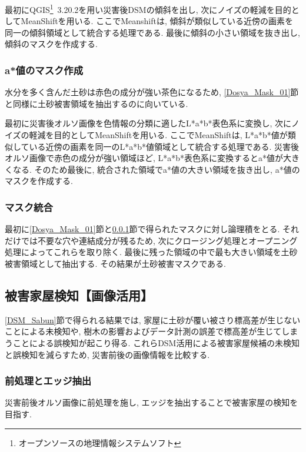 \documentclass[a4paper, twocolumn, xelatex, 10pt, ja=standard, Ligatures=TeX]{bxjsarticle}
\begin{document}
				最初にQGIS\footnote{オープンソースの地理情報システムソフト}\ 3.20.2を用い災害後DSMの傾斜を出し, 次にノイズの軽減を目的としてMeanShiftを用いる. 
				ここでMeanshiftは, 傾斜が類似している近傍の画素を同一の傾斜領域として統合する処理である. 最後に傾斜の小さい領域を抜き出し, 傾斜のマスクを作成する. 

			\subsubsection{a*値のマスク作成}\label{Dosya_Mask_02}
				水分を多く含んだ土砂は赤色の成分が強い茶色になるため, \ref{Dosya_Mask_01}節と同様に土砂被害領域を抽出するのに向いている. 

				最初に災害後オルソ画像を色情報の分類に適したL*a*b*表色系に変換し, 次にノイズの軽減を目的としてMeanShiftを用いる. 
				ここでMeanShiftは, L*a*b*値が類似している近傍の画素を同一のL*a*b*値領域として統合する処理である. 
				災害後オルソ画像で赤色の成分が強い領域ほど, L*a*b*表色系に変換するとa*値が大きくなる. 
				そのため最後に, 統合された領域でa*値の大きい領域を抜き出し, a*値のマスクを作成する. 

			\subsubsection{マスク統合}\label{Dosya_Mask_03}
				最初に\ref{Dosya_Mask_01}節と\ref{Dosya_Mask_02}節で得られたマスクに対し論理積をとる. 
				それだけでは不要な穴や連結成分が残るため, 次にクロージング処理とオープニング処理によってこれらを取り除く. 
				最後に残った領域の中で最も大きい領域を土砂被害領域として抽出する. その結果が土砂被害マスクである. 

		\subsection{被害家屋検知【画像活用】}\label{Ortho_Sabun}
			\ref{DSM_Sabun}節で得られる結果では, 家屋に土砂が覆い被さり標高差が生じないことによる未検知や, 
			樹木の影響およびデータ計測の誤差で標高差が生じてしまうことによる誤検知が起こり得る. 
			これらDSM活用による被害家屋候補の未検知と誤検知を減らすため, 災害前後の画像情報を比較する. 

			\subsubsection{前処理とエッジ抽出}\label{Ortho_Sabun_01}
				災害前後オルソ画像に前処理を施し, エッジを抽出することで被害家屋の検知を目指す. 
\end{document}
